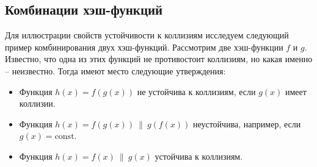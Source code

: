\subsection{Комбинации хэш-функций}

Для иллюстрации свойств устойчивости к коллизиям исследуем следующий пример комбинирования двух хэш-функций. Рассмотрим две хэш-функции $f$ и $g$. Известно, что одна из этих функций не противостоит коллизиям, но какая именно -- неизвестно. Тогда имеют место следующие утверждения:
\begin{itemize}
    \item Функция $h(x) = f(g(x))$ не устойчива к коллизиям, если $g(x)$ имеет коллизии.
    \item Функция $h(x) = f(g(x)) ~\|~ g(f(x))$ неустойчива, например, если $g(x) = \textrm{const}$.
    \item Функция $h(x) = f(x) ~\|~ g(x)$ устойчива к коллизиям.
\end{itemize}
